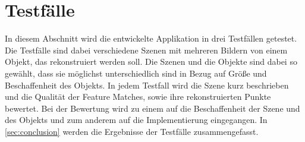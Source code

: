 
\chapter{Testfälle}
\label{sec:testcases}

In diesem Abschnitt wird die entwickelte Applikation in drei Testfällen getestet.
Die Testfälle sind dabei verschiedene Szenen mit mehreren Bildern von einem Objekt, das rekonstruiert werden soll.
Die Szenen und die Objekte sind dabei so gewählt, dass sie möglichst unterschiedlich sind in Bezug auf Größe und Beschaffenheit des Objekts.
In jedem Testfall wird die Szene kurz beschrieben und die Qualität der Feature Matches, sowie ihre rekonstruierten Punkte bewertet.
Bei der Bewertung wird zu einem auf die Beschaffenheit der Szene und des Objekts und zum anderem auf die Implementierung eingegangen.
In \cref{sec:conclusion} werden die Ergebnisse der Testfälle zusammengefasst.


\newpage

\newpage

\newpage

